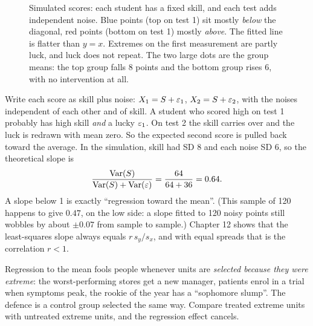 \begin{figure}[H]
\caption{Simulated scores: each student has a fixed skill, and each test adds
independent noise. Blue points (top on test 1) sit mostly \emph{below} the
diagonal, red points (bottom on test 1) mostly \emph{above}. The fitted line is
flatter than $y=x$. Extremes on the first measurement are partly luck, and luck
does not repeat. The two large dots are the group means: the top group falls 8
points and the bottom group rises 6, with no intervention at all.}
\label{fig:pitfalls-rtm}
\end{figure}

\begin{whybox}
Write each score as skill plus noise: $X_1=S+\varepsilon_1$, $X_2=S+\varepsilon_2$, with the noises
independent of each other and of skill. A student who scored high on test 1
probably has high skill \emph{and} a lucky $\varepsilon_1$. On test 2 the skill carries
over and the luck is redrawn with mean zero. So the expected second score is pulled
back toward the average. In the simulation, skill had SD 8 and each noise SD 6, so
the theoretical slope is
\[
  \frac{\operatorname{Var}(S)}{\operatorname{Var}(S)+\operatorname{Var}(\varepsilon)}=\frac{64}{64+36}=0.64.
\]
A slope below 1 is exactly ``regression toward the mean''. (This sample of 120
happens to give $0.47$, on the low side: a slope fitted to 120 noisy points still
wobbles by about $\pm0.07$ from sample to sample.) Chapter 12 shows that the least-squares slope
always equals $r\,s_y/s_x$, and with equal spreads that is the correlation
$r<1$.
\end{whybox}

Regression to the mean fools people whenever units are \emph{selected because they
were extreme}: the worst-performing stores get a new manager, patients enrol in a
trial when symptoms peak, the rookie of the year has a ``sophomore slump''. The
defence is a control group selected the same way. Compare treated extreme units with
untreated extreme units, and the regression effect cancels.

